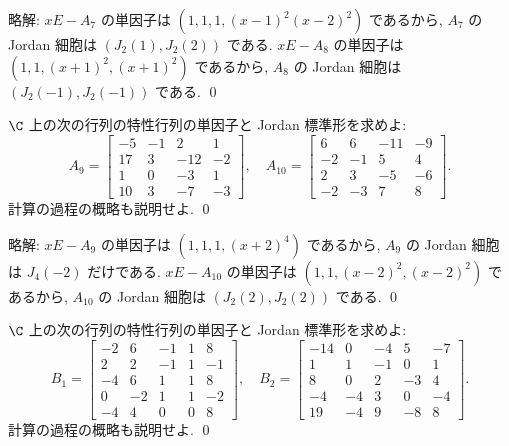 \documentclass[12pt,twoside]{jarticle}
\newcommand\commentout[1]{#1}
\newcommand\commentout[1]{}
\begin{document}
\commentout{
\noindent
略解: $xE-A_7$ の単因子は $(1,1,1,(x-1)^2(x-2)^2)$ であるから,
$A_7$ の Jordan 細胞は $(J_2(1),J_2(2))$ である.
$xE-A_8$ の単因子は $(1,1,(x+1)^2,(x+1)^2)$ であるから,
$A_8$ の Jordan 細胞は $(J_2(-1),J_2(-1))$ である.
\qed
}


\begin{question}
\label{q:ed-j-5}
  $\C$ 上の次の行列の特性行列の単因子と Jordan 標準形を求めよ:
  \begin{equation*}
    A_9 = \left[ 
      \begin{array}{rrrr}
        -5 & -1 & 2 & 1 \\
        17 & 3 & -12 & -2 \\
        1 & 0 & -3 & 1 \\
        10 & 3 & -7 & -3
      \end{array}
    \right],
    \quad
    A_{10} = \left[ 
      \begin{array}{rrrr}
        6 & 6 & -11 & -9 \\
        -2 & -1 & 5 & 4 \\
        2 & 3 & -5 & -6 \\
        -2 & -3 & 7 & 8
      \end{array}
    \right].
  \end{equation*}
  計算の過程の概略も説明せよ. \qed
\end{question}

\commentout{
\noindent
略解: $xE-A_9$ の単因子は $(1,1,1,(x+2)^4)$ であるから,
$A_9$ の Jordan 細胞は $J_4(-2)$ だけである.
$xE-A_{10}$ の単因子は $(1,1,(x-2)^2,(x-2)^2)$ であるから,
$A_{10}$ の Jordan 細胞は $(J_2(2),J_2(2))$ である.
\qed
}


\begin{question}
\label{q:ed-j-6}
  $\C$ 上の次の行列の特性行列の単因子と Jordan 標準形を求めよ:
  \begin{equation*}
    B_1 = \left[ 
      \begin{array}{rrrrr}
        -2 & 6 & -1 & 1 & 8 \\
        2 & 2 & -1 & 1 & -1 \\
        -4 & 6 & 1 & 1 & 8 \\
        0 & -2 & 1 & 1 & -2 \\
        -4 & 4 & 0 & 0 & 8
      \end{array}
    \right],
    \quad
    B_2 = \left[ 
      \begin{array}{rrrrr}
        -14 & 0 & -4 & 5 & -7 \\
        1 & 1 & -1 & 0 & 1 \\
        8 & 0 & 2 & -3 & 4 \\
        -4 & -4 & 3 & 0 & -4 \\
        19 & -4 & 9 & -8 & 8
      \end{array}
    \right].
  \end{equation*}
  計算の過程の概略も説明せよ. \qed
\end{question}
\end{document}

